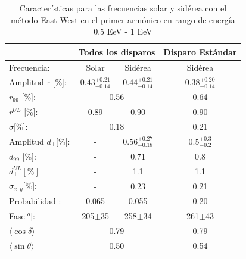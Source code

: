 \begin{table}[H]
        \begin{small}
            \begin{center}
                \begin{tabular}[c]{l|c|c||c|}
\cline{2-4}                                       & \multicolumn{2}{c||}{Todos los disparos}    & \multicolumn{1}{c|}{Disparo Estándar}   \\ \hline
\multicolumn{1}{|l|}{Frecuencia:                } & Solar	                & Sidérea	                & Sidérea \cite{Aab_2020}   \\ \hline
\multicolumn{1}{|l|}{Amplitud r [\%]:           } & $0.43^{+0.21}_{-0.14}$	& $0.44^{+0.21}_{-0.14}$ 	& $0.38^{+0.20}_{-0.14}$ \cite{codigo}      \\
\multicolumn{1}{|l|}{$r_{99}$ [\%]:             } & \multicolumn{2}{c||}{0.56}                         & 0.64\cite{codigo}                 \\
\multicolumn{1}{|l|}{$r^{UL}$ [\%]:             } & 0.89 	                & 0.90                      & 0.90 \cite{codigo}                 \\ 
\multicolumn{1}{|l|}{$\sigma$[\%]:              } & \multicolumn{2}{c||}{0.18}                         & 0.21 \cite{codigo}      \\\hline
\multicolumn{1}{|l|}{Amplitud $d_\perp$[\%]:    } & -	                    & $0.56^{+0.27}_{-0.18}$ 	& $0.5^{+0.3}_{-0.2}$       \\
\multicolumn{1}{|l|}{$d_{99}$ [\%]:             } & - 	                    & 0.71                      & 0.8   \cite{codigo}                \\
\multicolumn{1}{|l|}{$d_{\perp}^{UL}[\%]$       } & -                       & 1.1                       & 1.1                         \\
\multicolumn{1}{|l|}{$\sigma_{x,y}$[\%]:        } & -	                    & 0.23	                    & 0.21       \\\hline
\multicolumn{1}{|l|}{Probabilidad      :        } & 0.065                   & 0.055	                    & 0.20       \\
\multicolumn{1}{|l|}{Fase[$^o$]:                } & 205$\pm$35              & 258$\pm$34                & 261$\pm$43\\ \hline
\multicolumn{1}{|l|}{$\langle\cos\delta \rangle$} & \multicolumn{2}{c||}{0.79}        	                & 0.79 \cite{codigo}        \\        
\multicolumn{1}{|l|}{$\langle\sin\theta \rangle$} & \multicolumn{2}{c||}{0.50}        	                & 0.54\cite{codigo}        \\ \hline       
                \end{tabular}
            \end{center}
        \end{small}
        \caption{Características para las frecuencias solar y sidérea con el método East-West en el primer armónico en rango de energía 0.5 EeV - 1 EeV}
        \label{tab:solar}
    \end{table}


